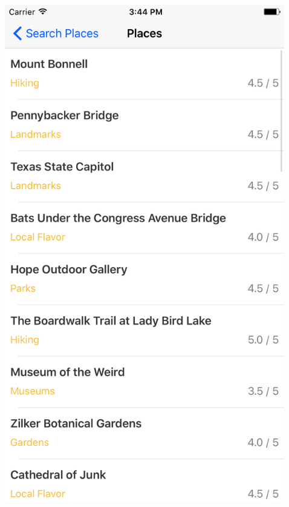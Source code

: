 \documentclass{beamer}
\begin{document}
\begin{frame}
\begin{columns}
\begin{column}{0.3\textwidth}
    \end{column}
    \begin{column}{0.3\textwidth}  %
        \begin{center}
            \includegraphics[scale=0.08]{placesTable} 
        \end{center}
    \end{column}
    \begin{column}{0.3\textwidth}  %
        \begin{center}

\end{center}
\end{column}
\end{columns}
\end{frame}
\end{document}
